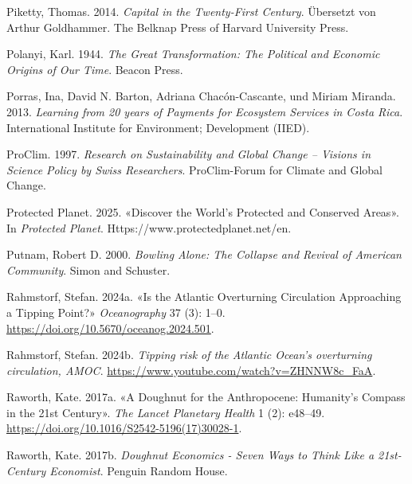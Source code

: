 \documentclass[
  nswissgerman,
  a4paper,
  openany]{book}
\newlength{\cslhangindent}
\newenvironment{CSLReferences}[2] %
 {\begin{list}{}{%
  \setlength{\itemindent}{0pt}
  \setlength{\leftmargin}{0pt}
  \setlength{\parsep}{0pt}
  \ifodd #1
   \setlength{\leftmargin}{\cslhangindent}
   \setlength{\itemindent}{-1\cslhangindent}
  \fi
  \setlength{\itemsep}{#2\baselineskip}}}
 {\end{list}}
\begin{document}
\begin{CSLReferences}{1}{1}
Piketty, Thomas. 2014. \emph{Capital in the {Twenty-First Century}}.
Übersetzt von Arthur Goldhammer. The Belknap Press of Harvard University
Press.

Polanyi, Karl. 1944. \emph{The {Great Transformation}: {The Political}
and {Economic Origins} of {Our Time}}. Beacon Press.

Porras, Ina, David N. Barton, Adriana Chacón-Cascante, und Miriam
Miranda. 2013. \emph{Learning from 20 years of {Payments} for
{Ecosystem} {Services} in {Costa} {Rica}}. International Institute for
Environment; Development (IIED).

ProClim. 1997. \emph{Research on {Sustainability} and {Global Change} --
{Visions} in {Science Policy} by {Swiss Researchers}}. {ProClim-Forum
for Climate and Global Change}.

Protected Planet. 2025. {«Discover the World's Protected and Conserved
Areas»}. In \emph{Protected Planet}. Https://www.protectedplanet.net/en.

Putnam, Robert D. 2000. \emph{Bowling {Alone}: {The Collapse} and
{Revival} of {American Community}}. {Simon and Schuster}.

Rahmstorf, Stefan. 2024a. {«Is the {Atlantic Overturning Circulation
Approaching} a {Tipping Point}?»} \emph{Oceanography} 37 (3): 1--0.
\url{https://doi.org/10.5670/oceanog.2024.501}.

Rahmstorf, Stefan. 2024b. \emph{Tipping risk of the {Atlantic} {Ocean}'s
overturning circulation, AMOC}.
\url{https://www.youtube.com/watch?v=ZHNNW8c_FaA}.

Raworth, Kate. 2017a. {«A {Doughnut} for the {Anthropocene}: Humanity's
Compass in the 21st Century»}. \emph{The Lancet Planetary Health} 1 (2):
e48--49. \url{https://doi.org/10.1016/S2542-5196(17)30028-1}.

Raworth, Kate. 2017b. \emph{Doughnut {Economics} - {Seven Ways} to
{Think Like} a 21st-{Century Economist}}. Penguin Random House.


\end{CSLReferences}
\end{document}

